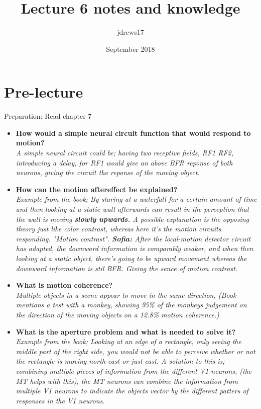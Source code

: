 \documentclass{article}
\title{Lecture 6 notes and knowledge}
\author{jdrews17}
\date{September 2018}
\begin{document}
\maketitle
\newpage

\section{Pre-lecture}
Preparation: Read chapter 7\\
\begin{itemize}
  \item \textbf{How would a simple neural circuit function that would respond to motion?}\\
    \textit{A simple neural circuit could be; having two receptive fields, RF1 RF2, introducing a delay, for RF1 would give an above BFR reponse of both neurons, giving the circuit the reponse of the moving object.}
  \item \textbf{How can the motion aftereffect be explained?}\\
    \textit{Example from the book; By staring at a waterfall for a certain amount of time and then looking at a static wall afterwards can result in the perception that the wall is moving \textbf{slowly upwards.} A possible explanation is the opposing theory just like color contrast, whereas here it's the motion circuits responding. "Motion contrast". \textbf{Sofia:} After the local-motion detector circuit has adapted, the downward information is comparably weaker, and when then looking at a static object, there's going to be upward movement whereas the downward information is stil BFR. Giving the sence of motion contrast.}
  \item \textbf{What is motion coherence?}\\
    \textit{Multiple objects in a scene appear to move in the same direction, (Book mentions a test with a monkey, showing 95\% of the monkeys judgement on the direction of the moving objects on a 12.8\% motion coherence.)}
  \item \textbf{What is the aperture problem and what is needed to solve it?}\\
    \textit{Example from the book; Looking at an edge of a rectangle, only seeing the middle part of the right side, you would not be able to perceive whether or not the rectangle is moving north-east or just east. A solution to this is; combining multiple pieces of information from the different V1 neurons, (the MT helps with this), the MT neurons can combine the information from multiple V1 neurons to indicate the objects vector by the different patters of responses in the V1 neurons.}

\end{itemize}
\end{document}
